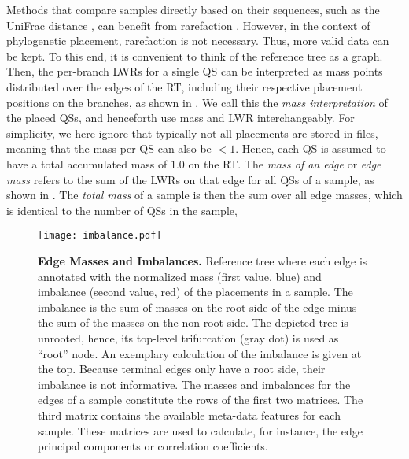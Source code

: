 Methods that compare samples directly based on their sequences,
such as the UniFrac distance \cite{Lozupone2005,Lozupone2007a},
can benefit from rarefaction \cite{Weiss2017}.
However, in the context of phylogenetic placement, rarefaction is not necessary.
Thus, more valid data can be kept.
To this end, it is convenient to think of the reference tree as a graph.
Then, the per-branch \acp{LWR} for a single \ac{QS}
can be interpreted as mass points distributed over the edges of the \ac{RT},
including their respective placement positions on the branches, as shown in .
We call this the \emph{mass interpretation} of the placed \acp{QS},
and henceforth use mass and \ac{LWR} interchangeably.
For simplicity, we here ignore that typically not all placements are stored in  files,
meaning that the mass per QS can also be $<1$.
Hence, each \ac{QS} is assumed to have a total accumulated mass of $1.0$ on the \ac{RT}.
The \emph{mass of an edge} or \emph{edge mass} refers to the sum of the \acp{LWR} on that edge for all \acp{QS} of a sample,
as shown in .
The \emph{total mass} of a sample is then the sum over all edge masses,
which is identical to the number of \acp{QS} in the sample,

\begin{figure}[!ht]
    \centering
    \texttt{[image: imbalance.pdf]}
    \begin{subfigure}{0pt}
        \label{fig:imbalance:sub:ReferenceTree}
    \end{subfigure}
    \begin{subfigure}{0pt}
        \label{fig:imbalance:sub:Matrices}
    \end{subfigure}
    \caption[Edge Masses and Imbalances]{
        \textbf{Edge Masses and Imbalances.}
        Reference tree where each edge is annotated with the normalized mass (first value, blue) and
        imbalance (second value, red) of the placements in a sample.
        The imbalance is the sum of masses on the root side of the edge minus the sum of the masses on the non-root side.
        The depicted tree is unrooted, hence, its top-level trifurcation (gray dot) is used as ``root'' node.
        An exemplary calculation of the imbalance is given at the top.
        Because terminal edges only have a root side, their imbalance is not informative.
        The masses and imbalances for the edges of a sample constitute the rows of the first two matrices.
        The third matrix contains the available meta-data features for each sample.
        These matrices are used to calculate, for instance, the edge principal components or correlation coefficients.
    }
    \label{fig:imbalance}
\end{figure}

